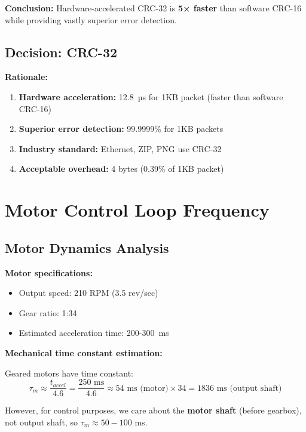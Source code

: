 \documentclass[12pt,letterpaper]{article}
\begin{document}
\textbf{Conclusion:} Hardware-accelerated CRC-32 is \textbf{5× faster} than software CRC-16 while providing vastly superior error detection.

\subsection{Decision: CRC-32}

\textbf{Rationale:}
\begin{enumerate}
    \item \textbf{Hardware acceleration:} 12.8~µs for 1KB packet (faster than software CRC-16)
    \item \textbf{Superior error detection:} 99.9999\% for 1KB packets
    \item \textbf{Industry standard:} Ethernet, ZIP, PNG use CRC-32
    \item \textbf{Acceptable overhead:} 4 bytes (0.39\% of 1KB packet)
\end{enumerate}

\section{Motor Control Loop Frequency}

\subsection{Motor Dynamics Analysis}

\textbf{Motor specifications:}
\begin{itemize}
    \item Output speed: 210 RPM (3.5 rev/sec)
    \item Gear ratio: 1:34
    \item Estimated acceleration time: 200-300~ms
\end{itemize}

\textbf{Mechanical time constant estimation:}

Geared motors have time constant:
\begin{equation}
\tau_m \approx \frac{t_{accel}}{4.6} = \frac{250 \text{ ms}}{4.6} \approx 54 \text{ ms (motor)} \times 34 = 1836 \text{ ms (output shaft)}
\end{equation}

However, for control purposes, we care about the \textbf{motor shaft} (before gearbox), not output shaft, so $\tau_m \approx 50-100$ ms.
\end{document}
